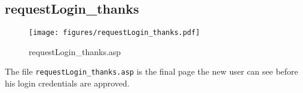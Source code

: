 \subsection{requestLogin\_thanks}
\begin{figure}[htb]
    \begin{center}
        \texttt{[image: figures/requestLogin\_thanks.pdf]}
    \end{center}
    \caption{requestLogin\_thanks.asp}
    \label{fig:requestLogin_thanks}
\end{figure}

The file \verb|requestLogin_thanks.asp| is the final page the new user can see
before his login credentials are approved.
